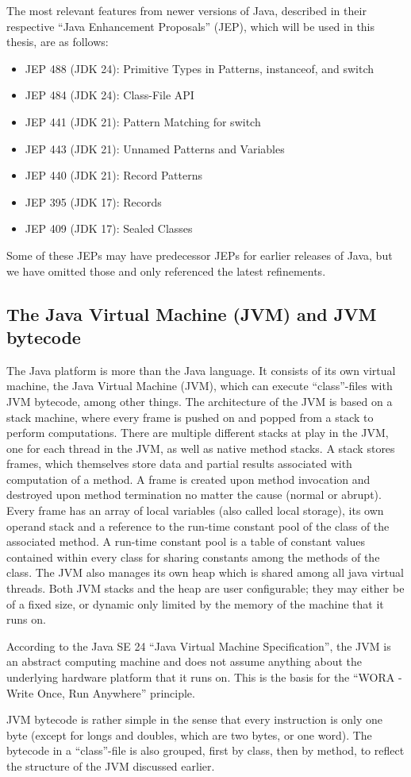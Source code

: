 The most relevant features from newer versions of Java, described in their respective ``Java Enhancement Proposals'' (JEP), which will be used in this thesis, are as follows:

\begin{itemize}
    \item JEP 488 (JDK 24): Primitive Types in Patterns, instanceof, and switch
    \item JEP 484 (JDK 24): Class-File API
    \item JEP 441 (JDK 21): Pattern Matching for switch
    \item JEP 443 (JDK 21): Unnamed Patterns and Variables
    \item JEP 440 (JDK 21): Record Patterns
    \item JEP 395 (JDK 17): Records
    \item JEP 409 (JDK 17): Sealed Classes
\end{itemize}

Some of these JEPs may have predecessor JEPs for earlier releases of Java, but we have omitted those and only referenced the latest refinements. 

\subsection{The Java Virtual Machine (JVM) and JVM bytecode}

The Java platform is more than the Java language. It consists of its own virtual machine,
the Java Virtual Machine (JVM), which can execute ``class''-files with JVM bytecode, among other things.
The architecture of the JVM is based on a stack machine, where every frame is pushed on and popped from
a stack to perform computations. There are multiple different stacks at play in the JVM, one for each
thread in the JVM, as well as native method stacks. A stack stores frames, which themselves store data
and partial results associated with computation of a method. A frame is created upon method invocation
and destroyed upon method termination no matter the cause (normal or abrupt). Every frame has an array
of local variables (also called local storage), its own operand stack and a reference to the run-time
constant pool of the class of the associated method. A run-time constant pool is a table of constant
values contained within every class for sharing constants among the methods of the class. The JVM
also manages its own heap which is shared among all java virtual threads. Both JVM stacks and the heap
are user configurable; they may either be of a fixed size, or dynamic only limited by the memory of
the machine that it runs on.

According to the Java SE 24 ``Java Virtual Machine Specification'', the JVM is an abstract computing machine
and does not assume anything about the underlying hardware platform that it runs on. This is the basis for the
``WORA - Write Once, Run Anywhere'' principle.

JVM bytecode is rather simple in the sense that every instruction is only one byte (except for longs and doubles, which are two bytes, or one word).
The bytecode in a ``class''-file is also grouped, first by class, then by method, to reflect the structure of the JVM discussed earlier.
